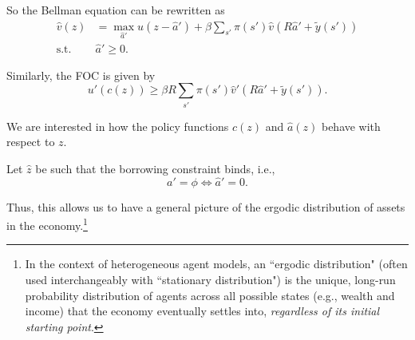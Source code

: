 So the Bellman equation can be rewritten as
\[
\begin{aligned}
    \hat v(z) & = \max_{\hat a'} u(z-\hat a') + \beta \sum_{s'}\pi(s')\hat v(R\hat a'+\tilde y(s'))\\
\text{s.t. } & \hat a' \ge 0.
\end{aligned}
\]

Similarly, the FOC is given by
\[
u'(c(z))\ge \beta R \sum_{s'}\pi(s')\hat v'(R\hat a'+\tilde y(s')).
\]

We are interested in how the policy functions $c(z)$ and $\hat a(z)$ behave with respect to $z$. 

Let $\hat z$ be such that the borrowing constraint binds, i.e., 
\[
a' = \phi \iff \hat a' = 0.
\]

\begin{center}
\end{center}

Thus, this allows us to have a general picture of the ergodic distribution of assets in the economy.\footnote{
    In the context of heterogeneous agent models, an ``ergodic distribution" (often used interchangeably with ``stationary distribution") is the unique, long-run probability distribution of agents across all possible states (e.g., wealth and income) that the economy eventually settles into, \textit{regardless of its initial starting point}.
}

